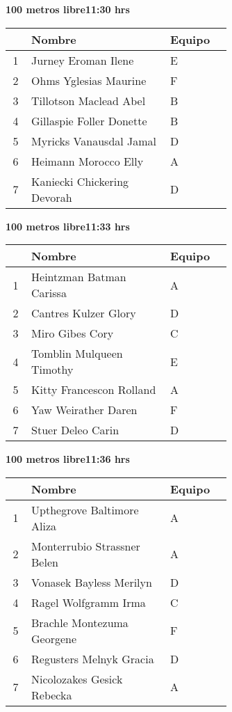 \begin{minipage}{0.95\linewidth}
\begin{center}
\textbf{
100 metros libre\hspace{1cm}11:30 hrs}
\end{center}
\begin{tabular}{cp{0.63\linewidth}l}
\hline
& \textbf{Nombre} & \textbf{Equipo} \\ \hline
1 & Jurney Eroman Ilene & E \\ 
2 & Ohms Yglesias Maurine & F \\ 
3 & Tillotson Maclead Abel & B \\ 
4 & Gillaspie Foller Donette & B \\ 
5 & Myricks Vanausdal Jamal & D \\ 
6 & Heimann Morocco Elly & A \\ 
7 & Kaniecki Chickering Devorah & D \\ 
\end{tabular}
\end{minipage}
\begin{minipage}{0.95\linewidth}
\begin{center}
\textbf{
100 metros libre\hspace{1cm}11:33 hrs}
\end{center}
\begin{tabular}{cp{0.63\linewidth}l}
\hline
& \textbf{Nombre} & \textbf{Equipo} \\ \hline
1 & Heintzman Batman Carissa & A \\ 
2 & Cantres Kulzer Glory & D \\ 
3 & Miro Gibes Cory & C \\ 
4 & Tomblin Mulqueen Timothy & E \\ 
5 & Kitty Francescon Rolland & A \\ 
6 & Yaw Weirather Daren & F \\ 
7 & Stuer Deleo Carin & D \\ 
\end{tabular}
\end{minipage}
\begin{minipage}{0.95\linewidth}
\begin{center}
\textbf{
100 metros libre\hspace{1cm}11:36 hrs}
\end{center}
\begin{tabular}{cp{0.63\linewidth}l}
\hline
& \textbf{Nombre} & \textbf{Equipo} \\ \hline
1 & Upthegrove Baltimore Aliza & A \\ 
2 & Monterrubio Strassner Belen & A \\ 
3 & Vonasek Bayless Merilyn & D \\ 
4 & Ragel Wolfgramm Irma & C \\ 
5 & Brachle Montezuma Georgene & F \\ 
6 & Regusters Melnyk Gracia & D \\ 
7 & Nicolozakes Gesick Rebecka & A \\ 
\end{tabular}
\end{minipage}
